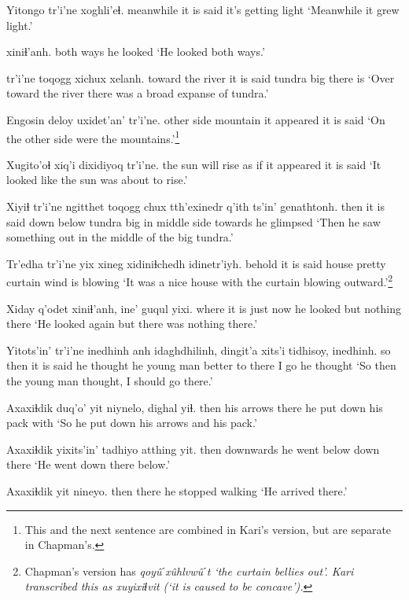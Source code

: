 \documentclass[12pt]{article}
\begin{document}
\gll Yitongo tr'i'ne xoghli'eɬ.
meanwhile {it is said} {it's getting light}
\glt `Meanwhile it grew light.'
\glend

 xiniɬ'anh.
{both ways}  {he looked}
\glt `He looked both ways.'
\glend

  tr'i'ne toqogg xichux xelanh.
{toward the river} {it is said} tundra  big {there is}
\glt `Over toward the river there was a broad expanse of tundra.'
\glend

\gll Engosin deloy  uxidet'an' tr'i'ne. 
{other side} mountain {it appeared} {it is said} 
\glt `On the other side were the mountains.'\footnote{This and the next sentence are combined in Kari's version, but are separate in Chapman's.}
\glend

\gll Xugito'oɬ  xiq'i dixidiyoq tr'i'ne.
{the sun will rise} {as if} {it appeared} {it is said}
\glt `It looked like the sun was about to rise.'
\glend

\gll Xiyiɬ tr'i'ne ngitthet  toqogg chux tth'exinedr q'ith ts'in' genathtonh.
then {it is said} {down below} tundra  big {in middle} side towards {he glimpsed}
\glt `Then he saw something out in the middle of the big tundra.'
\glend

\gll Tr'edha tr'i'ne yix xineg  xidiniɬchedh idinetr'iyh.
behold  {it is said} house pretty curtain {wind is blowing}
\glt `It was a nice house with the curtain blowing outward.'\footnote{Chapman's version has \em qoy\^uˊx\^uhlvw\^uˊt \em `the curtain bellies out'. Kari transcribed this as \em xuyixiɬvit (\em `it is caused to be concave').}
\glend

\gll Xiday q'odet xiniɬ'anh, ine' guqul   yixi.
{where it is} {just now} {he looked} but nothing there
\glt `He looked again but there was nothing there.'
\glend

\gll Yitots'in' tr'i'ne inedhinh anh idaghdhilinh, dingit'a xits'i  tidhisoy, inedhinh.
{so then} {it is said} {he thought} he {young man} better  {to there} {I go} {he thought}
\glt `So then the young man thought, I should go there.'
\glend

\gll Axaxiɬdik duq'o'  yit niynelo, dighal yiɬ.
then  {his arrows} there {he put down} {his pack} with
\glt `So he put down his arrows and his pack.'
\glend

\gll Axaxiɬdik yixits'in' tadhiyo  atthing yit.
then  downwards {he went below} down  there
\glt `He went down there below.'
\glend

\gll Axaxiɬdik yit nineyo.
then  there {he stopped walking}
\glt `He arrived there.'
\glend
\end{document}
